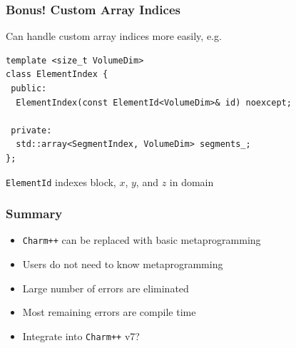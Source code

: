 \documentclass[svgnames,tikz,serif,ragged2e]{beamer}
\begin{document}
\begin{frame}[fragile]
  \frametitle{Bonus! Custom Array Indices}
  Can handle custom array indices more easily, e.g.
\begin{lstlisting}
template <size_t VolumeDim>
class ElementIndex {
 public:
  ElementIndex(const ElementId<VolumeDim>& id) noexcept;

 private:
  std::array<SegmentIndex, VolumeDim> segments_;
};
\end{lstlisting}
  \texttt{ElementId} indexes block, $x$, $y$, and $z$ in domain
\end{frame}

\begin{frame}
  \frametitle{Summary}
  \begin{itemize}
  \item \texttt{Charm++} can be replaced with basic metaprogramming
  \item Users do not need to know metaprogramming
  \item Large number of errors are eliminated
  \item Most remaining errors are compile time
    \item Integrate into \texttt{Charm++} v7?
  \end{itemize}
\end{frame}
\end{document}
